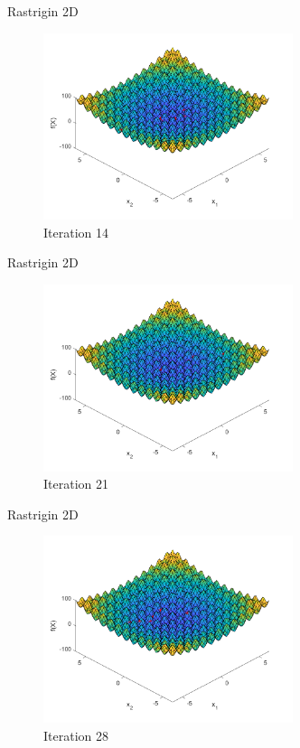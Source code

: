 \documentclass[xcolor=table]{beamer}
\begin{document}
\begin{frame}{Rastrigin 2D}
  \begin{figure}[h]
  \begin{center}
    \includegraphics[width=0.65\textwidth]{img/smpl/rast2d/loa-iter-14}
    \caption{Iteration 14}
  \end{center}
  \end{figure}
\end{frame}
\begin{frame}{Rastrigin 2D}
  \begin{figure}[h]
  \begin{center}
    \includegraphics[width=0.65\textwidth]{img/smpl/rast2d/loa-iter-21}
    \caption{Iteration 21}
  \end{center}
  \end{figure}
\end{frame}
\begin{frame}{Rastrigin 2D}
  \begin{figure}[h]
  \begin{center}
    \includegraphics[width=0.65\textwidth]{img/smpl/rast2d/loa-iter-28}
    \caption{Iteration 28}
  \end{center}
  \end{figure}
\end{frame}
\end{document}
